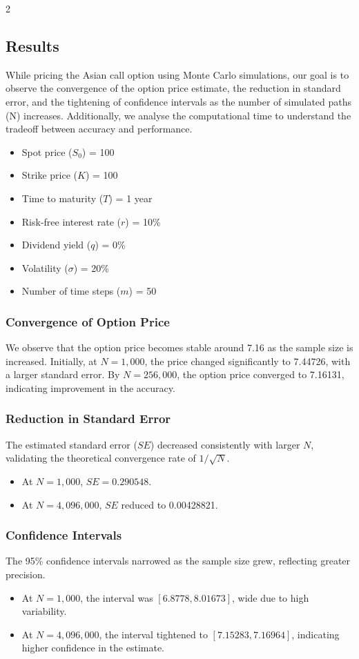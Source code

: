 \begin{multicols}{2}
\subsection{Results}
While pricing the Asian call option using Monte Carlo simulations, our goal is to observe the convergence of the option price estimate, the reduction in standard error, and the tightening of confidence intervals as the number of simulated paths (N) increases. Additionally, we analyse the computational time to understand the tradeoff between accuracy and performance.
\begin{itemize}
    \item Spot price (\(S_0\)) = 100
    \item Strike price (\(K\)) = 100
    \item Time to maturity (\(T\)) = 1 year
    \item Risk-free interest rate (\(r\)) = 10\%
    \item Dividend yield (\(q\)) = 0\%
    \item Volatility (\(\sigma\)) = 20\%
    \item Number of time steps (\(m\)) = 50
\end{itemize}


\subsubsection{Convergence of Option Price}
We observe that the option price becomes stable around 7.16 as the sample size is increased. Initially, at \(N = 1,000\), the price changed significantly to 7.44726, with a larger standard error. By \(N = 256,000\), the option price converged to 7.16131, indicating improvement in the accuracy.

\subsubsection{Reduction in Standard Error}
The estimated standard error (\(SE\)) decreased consistently with larger \(N\), validating the theoretical convergence rate of \(1/\sqrt{N}\).
\begin{itemize}
    \item At \(N = 1,000\), \(SE = 0.290548\).
    \item At \(N = 4,096,000\), \(SE\) reduced to 0.00428821.
\end{itemize}

\subsubsection{Confidence Intervals}
The 95\% confidence intervals narrowed as the sample size grew, reflecting greater precision.
\begin{itemize}
    \item At \(N = 1,000\), the interval was \([6.8778, 8.01673]\), wide due to high variability.
    \item At \(N = 4,096,000\), the interval tightened to \([7.15283, 7.16964]\), indicating higher confidence in the estimate.
\end{itemize}
\end{multicols}
